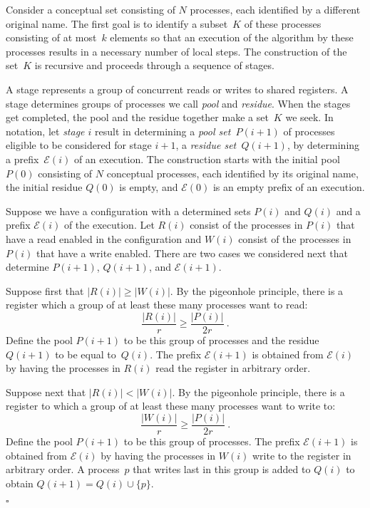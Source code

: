 \documentclass[11pt]{article}
\newcommand{\cE}{\mathcal{E}}
\newcommand{\qed}{\hfill $\square$ \smallbreak}
\newenvironment{proof}{\noindent{\bf Proof:}}{\qed}
\begin{document}
\begin{proof} 
Consider a conceptual set consisting of $N$ processes, each identified by a different original name.
The first goal is to identify a subset~$K$ of these processes consisting of at most~$k$ elements so that an execution of the algorithm by these processes results in a necessary number of local steps. 
The construction of the set~$K$ is recursive and proceeds through a sequence of stages.

A stage represents a group of concurrent reads or writes to shared registers.
A stage determines groups of processes we call \emph{pool} and \emph{residue}.
When the stages get completed, the pool and the residue together make a set~$K$ we seek.
In notation, let \emph{stage $i$} result in determining a \emph{pool set~$P(i+1)$} of processes eligible to be considered for stage $i+1$, a \emph{residue set~$Q(i+1)$}, by determining a prefix~$\cE(i)$ of an execution.
The construction starts with the initial pool~$P(0)$ consisting of $N$ conceptual processes, each identified by its  original name, the initial residue $Q(0)$ is empty, and $\cE(0)$ is  an empty prefix of an execution.


Suppose we have a configuration with a determined sets $P(i)$ and $Q(i)$ and a prefix $\cE(i)$ of the execution.
Let $R(i)$ consist of the processes in $P(i)$ that have a read enabled in the configuration and $W(i)$ consist of the processes in $P(i)$ that have a write enabled.
There are two cases we considered next that determine $P(i+1)$, $Q(i+1)$, and $\cE(i+1)$.

Suppose first that $|R(i)|\ge |W(i)|$.
By the pigeonhole principle, there is a register which a group of at least these many processes want to read:
\[
\frac{|R(i)|}{r}\ge \frac{|P(i)|}{2r}
\ .
\] 
Define the pool $P(i+1)$ to be this group of processes and the residue $Q(i+1)$ to be equal to~$Q(i)$. 
The prefix $\cE(i+1)$ is obtained from $\cE(i)$ by having the processes in $R(i)$ read the register in arbitrary order. 

Suppose next that $|R(i)| < |W(i)|$.
By the pigeonhole principle, there is a register to which  a group of at least these many processes want to write to:
\[
\frac{|W(i)|}{r}\ge \frac{|P(i)|}{2r}
\ .
\] 
Define the pool $P(i+1)$ to be this group of processes.
The prefix $\cE(i+1)$ is obtained from $\cE(i)$ by having the processes in $W(i)$ write to the register in arbitrary order. 
A process~$p$ that writes last in this group is added to $Q(i)$ to obtain $Q(i+1)=Q(i)\cup\{ p \}$.


\end{proof}
\end{document}

